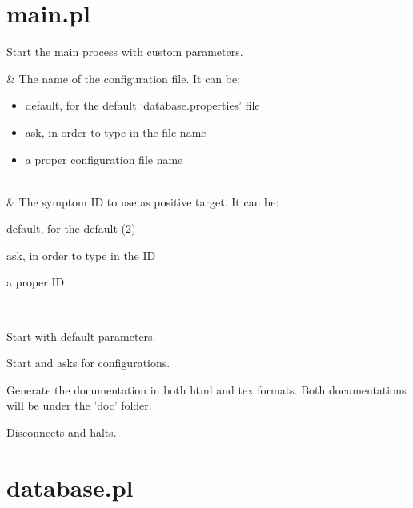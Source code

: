 


\section{main.pl}

\label{sec:main}

\begin{description}
Start the main process with custom parameters.

\begin{arguments}
 & The name of the configuration file. It can be:

\begin{itemize}
    \item default, for the default 'database.properties' file
    \item ask, in order to type in the file name
    \item a proper configuration file name
\end{itemize}

 \\
 & The symptom ID to use as positive target. It can be:

\begin{shortlist}
    \item default, for the default (2)
    \item ask, in order to type in the ID
    \item a proper ID
\end{shortlist}

 \\
\end{arguments}

Start  with default parameters.

Start  and asks for configurations.

Generate the documentation in both html and tex formats.
Both documentations will be under the 'doc' folder.

Disconnects and halts.
\end{description}

\section{database.pl}

